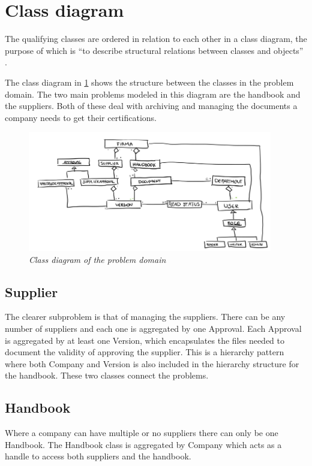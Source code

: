 \section{Class diagram}
The qualifying classes are ordered in relation to each other in a class diagram, the purpose of which is ``to describe structural relations between classes and objects'' \citep[p.~71]{Rod-Aalborg}.

The class diagram in \cref{fig:ClassDiagram} shows the structure between the classes in the problem domain.
The two main problems modeled in this diagram are the handbook and the suppliers.
Both of these deal with archiving and managing the documents a company needs to get their certifications.

\begin{figure}[H]
	\centering
	\includegraphics[width=0.95\textwidth]{billeder/classDiagram.png}
	\caption{\textit{Class diagram of the problem domain
	}\label{fig:ClassDiagram}}
\end{figure}

\subsection{Supplier}
The clearer subproblem is that of managing the suppliers.
There can be any number of suppliers and each one is aggregated by one Approval.
Each Approval is aggregated by at least one Version, which encapsulates the files needed to document the validity of approving the supplier.
This is a hierarchy pattern where both Company and Version is also included in the hierarchy structure for the handbook.
These two classes connect the problems.

\subsection{Handbook}
Where a company can have multiple or no suppliers there can only be one Handbook. The Handbook class is aggregated by Company which acts as a handle to access both suppliers and the handbook.

